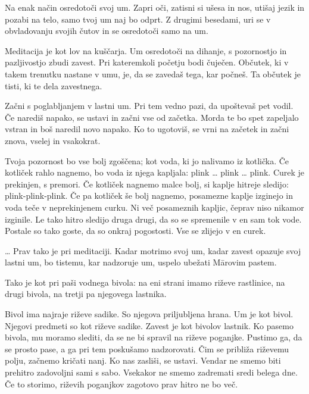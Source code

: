 Na enak način osredotoči svoj um. Zapri oči, zatisni si ušesa in nos, utišaj jezik in pozabi na telo, samo tvoj um naj bo odprt. Z drugimi besedami, uri se v obvladovanju svojih čutov in se osredotoči samo na um.

Meditacija je kot lov na kuščarja. Um osredotoči na dihanje, s pozornostjo in pazljivostjo zbudi zavest. Pri kateremkoli početju bodi čuječen. Občutek, ki v takem trenutku nastane v umu, je, da se zavedaš tega, kar počneš. Ta občutek je tisti, ki te dela zavestnega.

\clearpage


Začni s poglabljanjem v lastni um. Pri tem vedno pazi, da upoštevaš pet vodil. Če narediš napako, se ustavi in začni vse od začetka. Morda te bo spet zapeljalo vstran in boš naredil novo napako. Ko to ugotoviš, se vrni na začetek in začni znova, vselej in vsakokrat.

Tvoja pozornost bo vse bolj zgoščena; kot voda, ki jo nalivamo iz kotlička. Če kotliček rahlo nagnemo, bo voda iz njega kapljala: plink \ldots{} plink \ldots{} plink. Curek je prekinjen, s premori. Če kotliček nagnemo malce bolj, si kaplje hitreje sledijo: plink-plink-plink. Če pa kotliček še bolj nagnemo, posamezne kaplje izginejo in voda teče v neprekinjenem curku. Ni več posameznih kapljic, čeprav niso nikamor izginile. Le tako hitro sledijo druga drugi, da so se spremenile v en sam tok vode. Postale so tako goste, da so onkraj pogostosti. Vse se zlijejo v en curek.

\clearpage


\ldots{} Prav tako je pri meditaciji. Kadar motrimo svoj um, kadar zavest opazuje svoj lastni um, bo tistemu, kar nadzoruje um, uspelo ubežati Mārovim pastem.

Tako je kot pri paši vodnega bivola: na eni strani imamo riževe rastlinice, na drugi bivola, na tretji pa njegovega lastnika.

Bivol ima najraje riževe sadike. So njegova priljubljena hrana. Um je kot bivol. Njegovi predmeti so kot riževe sadike. Zavest je kot bivolov lastnik. Ko pasemo bivola, mu moramo slediti, da se ne bi spravil na riževe poganjke. Pustimo ga, da se prosto pase, a ga pri tem poskušamo nadzorovati. Čim se približa riževemu polju, začnemo kričati nanj. Ko nas zasliši, se ustavi. Vendar ne smemo biti prehitro zadovoljni sami s sabo. Vsekakor ne smemo zadremati sredi belega dne. Če to storimo, riževih poganjkov zagotovo prav hitro ne bo več.

